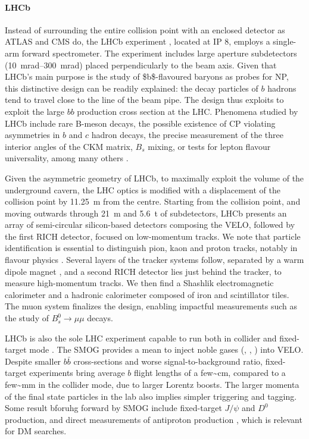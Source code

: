\documentclass[11pt]{article}
\newcommand{\bb}{$b\bar{b}$}
\newcommand{\jpsi}{$J/\psi$}
\begin{document}
\paragraph{LHCb}

Instead of surrounding the entire collision point with an enclosed detector as \ac{ATLAS} and \ac{CMS} do, the \ac{LHCb} experiment \cite{lhcb_collab}, located at \ac{IP} 8, employs a single-arm forward spectrometer.
The experiment includes large aperture subdetectors (\SIrange{10}{300}{\milli\radian}) placed perpendicularly to the beam axis.
Given that \ac{LHCb}'s main purpose is the study of \$b\$-flavoured baryons as probes for \ac{NP}, this distinctive design can be readily explained: the decay particles of \(b\) hadrons tend to travel close to the line of the beam pipe.
The design thus exploits to exploit the large \(bb\) production cross section at the \ac{LHC}.
Phenomena studied by \ac{LHCb} include rare B-meson decays, the possible existence of \ac{CP} violating asymmetries in \(b\) and \(c\) hadron decays, the precise measurement of the three interior angles of the \ac{CKM} matrix, \(B_{s}\) mixing, or tests for lepton flavour universality, among many others \cite{lhcb_hllhc_tdr}.

Given the asymmetric geometry of LHCb, to maximally exploit the volume of the underground cavern, the LHC optics is modified  with a displacement of the collision point by \SI{11.25}{\m} from the centre.
Starting from the collision point, and moving outwards through \SI{21}{\m} and \SI{5.6}{\tonne} of subdetectors, \ac{LHCb} presents an array of semi-circular silicon-based detectors composing the \ac{VELO}, followed by the first \ac{RICH} detector, focused on low-momentum tracks.
We note that particle identification is essential to distinguish pion, kaon and proton tracks, notably in flavour physics \cite{lhcb_hllhc_tdr}.
Several layers of the tracker systems follow, separated by a warm dipole magnet \cite{lhcb_collab_tracker_tdr}, and a second \ac{RICH} detector lies just behind the tracker, to measure high-momentum tracks.
We then find a Shashlik electromagnetic calorimeter and a hadronic calorimeter composed of iron and scintillator tiles.
The muon system finalizes the design, enabling impactful measurements such as the study of \(B_{s}^{0}\rightarrow\mu\mu\) decays.

\ac{LHCb} is also the sole \ac{LHC} experiment capable to run both in collider and fixed-target mode \cite{lhcb_fixed_target}.
The \ac{SMOG} provides a mean to inject noble gases (, , ) into \ac{VELO}.
Despite smaller \bb{} cross-sections and worse signal-to-background ratio, fixed-target experiments bring average \(b\) flight lengths of a few\textasciitilde{}\si{\cm}, compared to a few\textasciitilde{}\si{\mm} in the collider mode, due to larger Lorentz boosts.
The larger momenta of the final state particles in the lab also implies simpler triggering and tagging.
Some result bforuhg forward by \ac{SMOG} include fixed-target \jpsi{} and \(D^{0}\) production, and direct measurements of antiproton production \cite{antimatter_prod_fixed_target_lhcb}, which is relevant for \ac{DM} searches.
\end{document}

